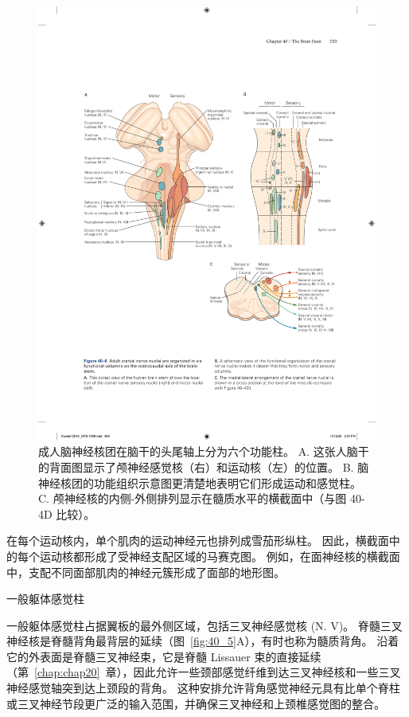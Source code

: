 \begin{figure}[htbp]
	\centering
	\includegraphics[width=0.95\linewidth]{chap40/fig_40_6}
	\caption{成人脑神经核团在脑干的头尾轴上分为六个功能柱。 A. 这张人脑干的背面图显示了颅神经感觉核（右）和运动核（左）的位置。 B. 脑神经核团的功能组织示意图更清楚地表明它们形成运动和感觉柱。 C. 颅神经核的内侧-外侧排列显示在髓质水平的横截面中（与图 40-4D 比较）。}
	\label{fig:40_6}
\end{figure}


在每个运动核内，单个肌肉的运动神经元也排列成雪茄形纵柱。
因此，横截面中的每个运动核都形成了受神经支配区域的马赛克图。
例如，在面神经核的横截面中，支配不同面部肌肉的神经元簇形成了面部的地形图。


一般躯体感觉柱

一般躯体感觉柱占据翼板的最外侧区域，包括三叉神经感觉核 (N. V)。
脊髓三叉神经核是脊髓背角最背层的延续（图~\ref{fig:40_5}A），有时也称为髓质背角。
沿着它的外表面是脊髓三叉神经束，它是脊髓 Lissauer 束的直接延续（第~\ref{chap:chap20}~章），因此允许一些颈部感觉纤维到达三叉神经核和一些三叉神经感觉轴突到达上颈段的背角。
这种安排允许背角感觉神经元具有比单个脊柱或三叉神经节段更广泛的输入范围，并确保三叉神经和上颈椎感觉图的整合。


